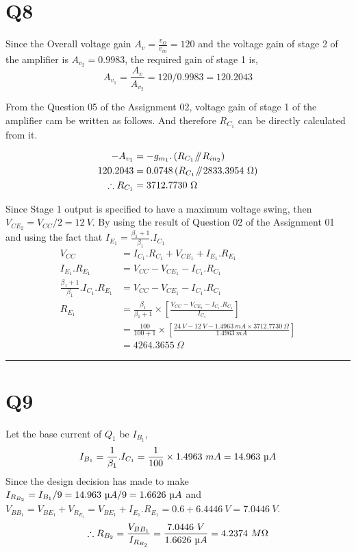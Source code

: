 \documentclass[legalpaper,11pt]{article}%
\newcommand{\parallelsum}{\mathbin{\!/\mkern-5mu/\!}}
\begin{document}
\section*{Q8}
Since the Overall voltage gain $A_v = \frac{v_O}{v_{in}} =  120$ and the voltage gain of stage 2 of the amplifier is $A_{v_2} = 0.9983$, the required gain of stage 1 is,
\[ A_{v_1} = \frac{A_v}{A_{v_2}} = 120/0.9983=  120.2043\]

From the Question 05 of the Assignment 02, voltage gain of stage 1 of the amplifier cam be written as follows. And therefore $R_{C_1}$ can be directly calculated from it.

\[
	\begin{split}
	-A_{v_1} & = -g_{m_1}.\left( R_{C_1} \parallelsum R_{in_2} \right)\\
	120.2043&= 0.0748 \left( R_{C_1} \parallelsum   2833.3954 ~\Omega \right)\\
	\therefore R_{C_1} & = 3712.7730~ \Omega
\end{split}
\]

Since Stage 1 output is specified to have a maximum voltage swing, then $V_{CE_2} = V_{CC}/2 = 12~V$. By using the result of Question 02 of the Assignment 01 and using the fact that $I_{E_1} = \frac{\beta_1+1}{\beta_1}.I_{C_1}$
\[\begin{split}
V_{CC} &= I_{C_1}.R_{C_1} + V_{CE_1} + I_{E_1}.R_{E_1}\\
I_{E_1}.R_{E_1}& = 	V_{CC} - V_{CE_1} - I_{C_1}.R_{C_1}\\
\frac{\beta_1+1}{\beta_1}.I_{C_1}.R_{E_1}& = 	V_{CC} - V_{CE_1} - I_{C_1}.R_{C_1}\\
R_{E_1}& = \frac{\beta_1}{\beta_1+1} \times	\left[ \frac{V_{CC} - V_{CE_1} - I_{C_1}.R_{C_1}}{I_{C_1}} \right]\\
& = \frac{100}{100+1} \times	\left[ \frac{24~V - 12~V - 1.4963~mA\times3712.7730~ \Omega}{1.4963~mA} \right]\\
&= 4264.3655 ~\Omega
\end{split}
\]
\hrule
\section*{Q9}
Let the base current of $Q_1$ be $I_{B_1}$,
\[ I_{B_1} = \frac{1}{\beta_1}.I_{C_1}  = \frac{1}{100}\times1.4963~mA =14.963 ~\micro A \]
Since the design decision has made to make $I_{R_{B_2}} = I_{B_1}/9 = 14.963 ~\micro A/9 = 1.6626 ~\micro A$ and 
 $V_{BB_1} = V_{BE_1} + V_{R_{E_1}} = V_{BE_1}  + I_{E_1}.R_{E_1}  = 0.6 + 6.4446 ~V =7.0446 ~V $. 
\[\therefore R_{B_2} = \frac{V_{BB_1}}{I_{R_{B_2}}} = \frac{7.0446~V}{1.6626 ~\micro A} = 4.2374~M\Omega \] %
\end{document}
